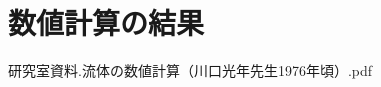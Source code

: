 \documentclass[upLaTeX,a4paper]{jsarticle}
\begin{document}
\section{数値計算の結果}


\begin{thebibliography}{9}
   研究室資料.流体の数値計算（川口光年先生1976年頃）.pdf
\end{thebibliography}
\end{document}
